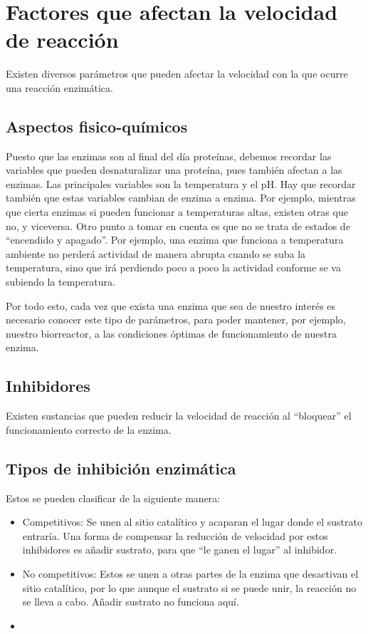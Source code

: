 


\section{Factores que afectan la velocidad de reacción}

Existen diversos parámetros que pueden afectar la velocidad con la que ocurre una reacción enzimática.

\subsection{Aspectos fisico-químicos}

Puesto que las enzimas son al final del día proteínas, debemos recordar las variables que pueden desnaturalizar una proteína, pues también afectan a las enzimas. Las principales variables son la temperatura y el pH. Hay que recordar también que estas variables cambian de enzima a enzima. Por ejemplo, mientras que cierta enzimas si pueden funcionar a temperaturas altas, existen otras que no, y viceversa. Otro punto a tomar en cuenta es que no se trata de estados de ``encendido y apagado''. Por ejemplo, una enzima que funciona a temperatura ambiente no perderá actividad de manera abrupta cuando se suba la temperatura, sino que irá perdiendo poco a poco la actividad conforme se va subiendo la temperatura.

Por todo esto, cada vez que exista una enzima que sea de nuestro interés es necesario conocer este tipo de parámetros, para poder mantener, por ejemplo, nuestro biorreactor, a las condiciones óptimas de funcionamiento de nuestra enzima.

\subsection{Inhibidores}

Existen sustancias que pueden reducir la velocidad de reacción al ``bloquear'' el funcionamiento correcto de la enzima. 

\subsection{Tipos de inhibición enzimática}

Estos se pueden clasificar de la siguiente manera:

\begin{itemize}
    \item Competitivos: Se unen al sitio catalítico y acaparan el lugar donde el sustrato entraría. Una forma de compensar la reducción de velocidad por estos inhibidores es añadir sustrato, para que ``le ganen el lugar'' al inhibidor.
    \item No competitivos: Estos se unen a otras partes de la enzima que desactivan el sitio catalítico, por lo que aunque el sustrato si se puede unir, la reacción no se lleva a cabo. Añadir sustrato no funciona aquí.
    \item 
\end{itemize}

